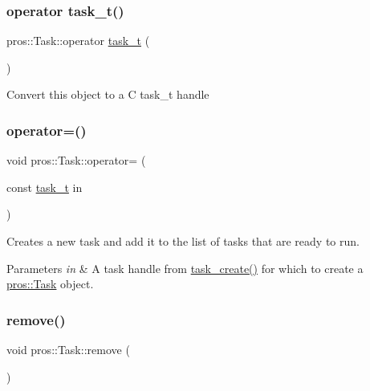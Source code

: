 \subsubsection{\texorpdfstring{operator task\+\_\+t()}{operator task\_t()}}
{\footnotesize\ttfamily pros\+::\+Task\+::operator \hyperlink{rtos_8h_a1d7e0825b8d8876e8cd8ece3f9115293}{task\+\_\+t} (\begin{DoxyParamCaption}{ }\end{DoxyParamCaption})\hspace{0.3cm}{\ttfamily [inline]}}

Convert this object to a C task\+\_\+t handle \mbox{\label{classpros_1_1Task_aaaeae2788114241e149317248998781e}} 
\subsubsection{\texorpdfstring{operator=()}{operator=()}}
{\footnotesize\ttfamily void pros\+::\+Task\+::operator= (\begin{DoxyParamCaption}\item[{const \hyperlink{rtos_8h_a1d7e0825b8d8876e8cd8ece3f9115293}{task\+\_\+t}}]{in }\end{DoxyParamCaption})}

Creates a new task and add it to the list of tasks that are ready to run.


\begin{DoxyParams}{Parameters}
{\em in} & A task handle from \hyperlink{rtos_8h_a2e3ed8f26b8c1edcff493bc583f0a76a}{task\+\_\+create()} for which to create a \hyperlink{classpros_1_1Task}{pros\+::\+Task} object. \\
\hline
\end{DoxyParams}
\mbox{\label{classpros_1_1Task_a45269807dfc87bb1d5e9580346793e9d}} 
\subsubsection{\texorpdfstring{remove()}{remove()}}
{\footnotesize\ttfamily void pros\+::\+Task\+::remove (\begin{DoxyParamCaption}{ }\end{DoxyParamCaption})}

